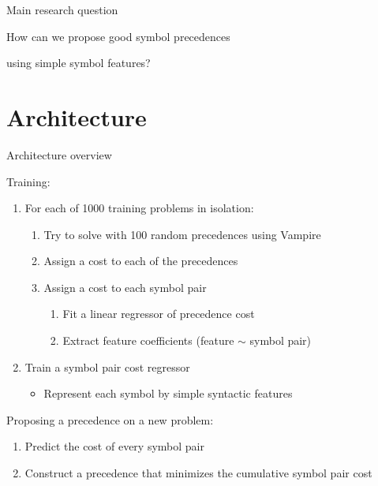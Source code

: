 \documentclass[notes]{beamer}
\begin{document}
\begin{frame}{Main research question}

\centering

How can we propose good symbol precedences

using simple symbol features?

\end{frame}

\section{Architecture}

\begin{frame}{Architecture overview}

Training:
\begin{enumerate}
	\item For each of 1000 training problems in isolation:
	\begin{enumerate}
		\item Try to solve with 100 random precedences using Vampire
		\item Assign a cost to each of the precedences
		\item Assign a cost to each symbol pair
		\begin{enumerate}
			\item Fit a linear regressor of precedence cost
			\item Extract feature coefficients (feature $\sim$ symbol pair)
		\end{enumerate}
	\end{enumerate}
	\item Train a symbol pair cost regressor
	\begin{itemize}
		\item Represent each symbol by simple syntactic features
	\end{itemize}
\end{enumerate}

Proposing a precedence on a new problem:
\begin{enumerate}
	\item Predict the cost of every symbol pair
	\item Construct a precedence that minimizes the cumulative symbol pair cost
\end{enumerate}

\end{frame}
\end{document}
